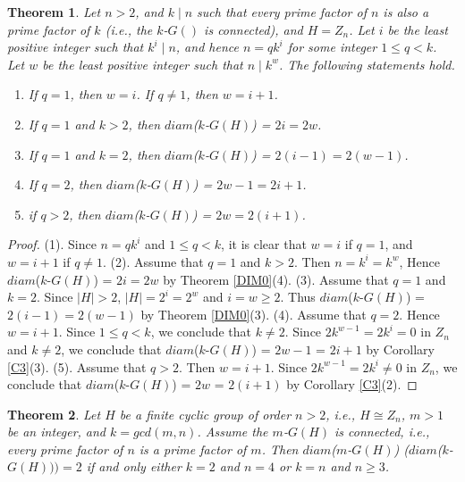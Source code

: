 \documentclass{amsart}
\newtheorem{thm}{Theorem}[section]
\theoremstyle{plain}
\begin{document}
\begin{thm}\label{CDIM}
	Let $n > 2$, and $k\mid n$ such that every prime factor of $n$ is also a prime factor of $k$ (i.e., the $k$-$G()$ is connected), and $H = Z_n$. Let $i$ be the least positive integer such that $k^i\mid n$, and hence $n = qk^i$ for some integer $1 \leq q < k$. Let $w$ be the least positive integer such that $n\mid k^w$.  The following statements hold.
	 \begin{enumerate}
	 	\item If $q = 1$, then $w = i$. If $q\not = 1$, then $w = i+1$.
	 	\item If $q = 1$ and $k >2$, then $diam$($k$-$G(H)$) = $2i = 2w$.
	 	\item If $q = 1$ and $k = 2$, then $diam$($k$-$G(H)$) = $2(i - 1) = 2(w-1)$.
	 	\item If $q = 2$, then $diam$($k$-$G(H)$) = $2w - 1 = 2i + 1$.
	 	\item if $q > 2$, then $diam$($k$-$G(H)$) = $2w = 2(i+1)$.
	 \end{enumerate}
\end{thm}
\begin{proof}
	(1). Since $n = qk^i$ and $1\leq q < k$, it is clear that $w = i$ if $q = 1$, and $w = i+1$ if $q\not = 1$.
(2). Assume that $q = 1$ and $k >2$. Then $n = k^i = k^w$, Hence  $diam$($k$-$G(H)$) = $2i = 2w$ by Theorem \ref{DIM0}(4).
\newline
(3). Assume that $q = 1$ and $k = 2$. Since $|H| > 2$, $|H| = 2^i = 2^w$ and  $i = w \geq 2$. Thus  $diam$($k$-$G(H)$) = $2(i - 1) = 2(w - 1)$ by Theorem \ref{DIM0}(3).
\newline
(4). Assume that $q = 2$. Hence $w = i + 1$. Since $1 \leq q <k$, we conclude that $k \not = 2$. Since $2k^{w-1} = 2k^i = 0$ in $Z_n$ and $k \not = 2$, we conclude that $diam$($k$-$G(H)$) = $2w - 1$ =  $2i + 1$ by Corollary \ref{C3}(3).
\newline
(5). Assume that $q > 2$. Then $w = i + 1$. Since $2k^{w-1} = 2k^i \not = 0$ in $Z_n$, we conclude that $diam$($k$-$G(H)$) = $2w$ =  $2(i + 1)$ by Corollary \ref{C3}(2).
	\end{proof}
	\begin{thm}\label{DIM2}
		Let $H$ be a finite cyclic group of order $n > 2$, i.e., $H \cong Z_n$, $m > 1$ be an integer, and $k = gcd(m, n)$.  Assume the $m$-$G(H)$ is connected, i.e., every prime factor of $n$ is a prime factor of $m$. Then $diam$($m$-$G(H)$) ($diam$($k$-$G(H))) = 2$ if and only either $k = 2$ and $n = 4$ or $k = n$ and $n \geq 3$.
	
	\end{thm}
\end{document}
